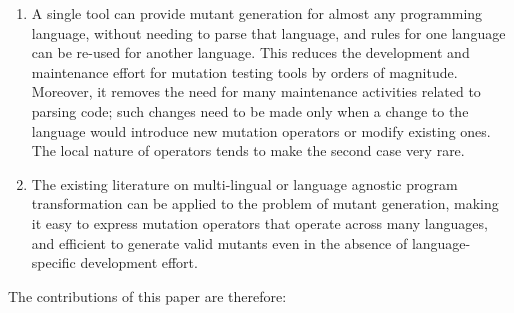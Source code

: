 \documentclass[sigconf,review, anonymous]{acmart}
\begin{document}
\begin{enumerate}
  \item A single tool can provide mutant generation for almost any
    programming language, without needing to parse that language, and
    rules for one language can be re-used for another language.  This
    reduces the development and maintenance effort for mutation
    testing tools by orders of magnitude.  Moreover, it removes the
    need for many   maintenance activities related to parsing code;
    such changes need to be made only when a change to the language
    would introduce new mutation operators or modify existing ones.
    The local nature of operators tends to make the second case very rare.
    \item The existing literature on multi-lingual or language
      agnostic program transformation can be applied to the problem of
      mutant generation, making it easy to express mutation operators
      that operate across many languages, and efficient to generate
      valid mutants even in the absence of language-specific
      development effort.
      \end{enumerate}

The contributions of this paper are therefore:
\end{document}
